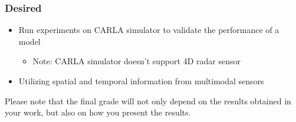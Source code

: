\documentclass[rnd]{mas_proposal}
\begin{document}
\subsubsection*{Desired}
\begin{itemize}
    \item Run experiments on CARLA simulator to validate the performance of a model
    \begin{itemize}
        \item Note: CARLA simulator doesn't support 4D radar sensor
    \end{itemize}
    \item Utilizing spatial and temporal information from multimodal sensors
    

\end{itemize}

Please note that the final grade will not only depend on the results obtained in your work, but also on how you present the results.

\nocite{*}

\end{document}
